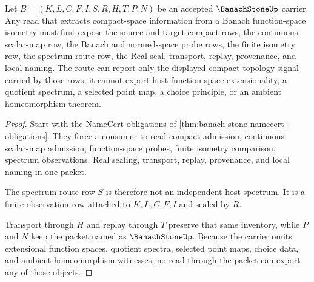 \begin{theorem}
\label{thm:banach-stone-isometry-spectrum-route}
Let $B=(K,L,C,F,I,S,R,H,T,P,N)$ be an accepted $\BanachStoneUp$ carrier. Any read that extracts compact-space information from a Banach function-space isometry must first expose the source and target compact rows, the continuous scalar-map row, the Banach and normed-space probe rows, the finite isometry row, the spectrum-route row, the Real seal, transport, replay, provenance, and local naming. The route can report only the displayed compact-topology signal carried by those rows; it cannot export host function-space extensionality, a quotient spectrum, a selected point map, a choice principle, or an ambient homeomorphism theorem.
\end{theorem}
\begin{proof}
Start with the NameCert obligations of \autoref{thm:banach-stone-namecert-obligations}. They force a consumer to read compact admission, continuous scalar-map admission, function-space probes, finite isometry comparison, spectrum observations, Real sealing, transport, replay, provenance, and local naming in one packet.

The spectrum-route row $S$ is therefore not an independent host spectrum. It is a finite observation row attached to $K,L,C,F,I$ and sealed by $R$.

Transport through $H$ and replay through $T$ preserve that same inventory, while $P$ and $N$ keep the packet named as $\BanachStoneUp$. Because the carrier omits extensional function spaces, quotient spectra, selected point maps, choice data, and ambient homeomorphism witnesses, no read through the packet can export any of those objects.
\end{proof}


\begin{closurestatus}{\BanachStoneUp}
  \theoryclosure{\seedClosure}
  \formalstatus{\unformalizedV}
\end{closurestatus}
